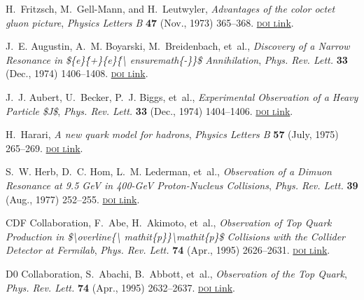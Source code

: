 \documentclass[ALICE,manyauthors]{cernphprep}
\begin{document}
\begin{thebibliography}{100}
H.~Fritzsch, M.~{Gell-Mann}, and H.~Leutwyler, {\it Advantages of the color
  octet gluon picture},  {\textsl{Physics Letters B}} {\footnotesize \bf 47}
  (Nov., 1973) 365--368.
  \href{http://dx.doi.org/10.1016/0370-2693(73)90625-4}{\footnotesize
  \textrm{\textsc{doi l}ink}}.

J.~E. Augustin, A.~M. Boyarski, M.~Breidenbach, et~al., {\it Discovery of a
  {{Narrow Resonance}} in \$\{e\}\^\{+\}\{e\}\^\{\textbackslash
  ensuremath\{-\}\}\$ {{Annihilation}}},  {\textsl{Phys. Rev. Lett.}}
  {\footnotesize \bf 33} (Dec., 1974) 1406--1408.
  \href{http://dx.doi.org/10.1103/PhysRevLett.33.1406}{\footnotesize
  \textrm{\textsc{doi l}ink}}.

J.~J. Aubert, U.~Becker, P.~J. Biggs, et~al., {\it Experimental {{Observation}}
  of a {{Heavy Particle}} \${{J}}\$},  {\textsl{Phys. Rev. Lett.}}
  {\footnotesize \bf 33} (Dec., 1974) 1404--1406.
  \href{http://dx.doi.org/10.1103/PhysRevLett.33.1404}{\footnotesize
  \textrm{\textsc{doi l}ink}}.

H.~Harari, {\it A new quark model for hadrons},  {\textsl{Physics Letters B}}
  {\footnotesize \bf 57} (July, 1975) 265--269.
  \href{http://dx.doi.org/10.1016/0370-2693(75)90072-6}{\footnotesize
  \textrm{\textsc{doi l}ink}}.

S.~W. Herb, D.~C. Hom, L.~M. Lederman, et~al., {\it Observation of a {{Dimuon
  Resonance}} at 9.5 {{GeV}} in 400-{{GeV Proton-Nucleus Collisions}}},
  {\textsl{Phys. Rev. Lett.}} {\footnotesize \bf 39} (Aug., 1977) 252--255.
  \href{http://dx.doi.org/10.1103/PhysRevLett.39.252}{\footnotesize
  \textrm{\textsc{doi l}ink}}.

{CDF Collaboration}, F.~Abe, H.~Akimoto, et~al., {\it Observation of {{Top
  Quark Production}} in \$\textbackslash overline\{\textbackslash
  mathit\{p\}\}\textbackslash mathit\{p\}\$ {{Collisions}} with the {{Collider
  Detector}} at {{Fermilab}}},  {\textsl{Phys. Rev. Lett.}} {\footnotesize \bf
  74} (Apr., 1995) 2626--2631.
  \href{http://dx.doi.org/10.1103/PhysRevLett.74.2626}{\footnotesize
  \textrm{\textsc{doi l}ink}}.

{D0 Collaboration}, S.~Abachi, B.~Abbott, et~al., {\it Observation of the {{Top
  Quark}}},  {\textsl{Phys. Rev. Lett.}} {\footnotesize \bf 74} (Apr., 1995)
  2632--2637.
  \href{http://dx.doi.org/10.1103/PhysRevLett.74.2632}{\footnotesize
  \textrm{\textsc{doi l}ink}}.


\end{thebibliography}
\end{document}
